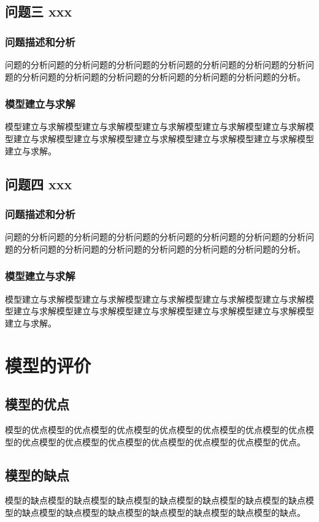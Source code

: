 \documentclass[withoutperface,bwprint]{gmcmthesis}
\numberwithin{figure}{section}
\begin{document}
\subsection{问题三 xxx}
\subsubsection{问题描述和分析}
问题的分析问题的分析问题的分析问题的分析问题的分析问题的分析问题的分析问题的分析问题的分析问题的分析问题的分析问题的分析问题的分析问题的分析。
\subsubsection{模型建立与求解}
模型建立与求解模型建立与求解模型建立与求解模型建立与求解模型建立与求解模型建立与求解模型建立与求解模型建立与求解模型建立与求解模型建立与求解模型建立与求解。

\subsection{问题四 xxx}
\subsubsection{问题描述和分析}
问题的分析问题的分析问题的分析问题的分析问题的分析问题的分析问题的分析问题的分析问题的分析问题的分析问题的分析问题的分析问题的分析问题的分析。
\subsubsection{模型建立与求解}
模型建立与求解模型建立与求解模型建立与求解模型建立与求解模型建立与求解模型建立与求解模型建立与求解模型建立与求解模型建立与求解模型建立与求解模型建立与求解。

\section{模型的评价}
\subsection{模型的优点}
模型的优点模型的优点模型的优点模型的优点模型的优点模型的优点模型的优点模型的优点模型的优点模型的优点模型的优点模型的优点模型的优点模型的优点。
\subsection{模型的缺点}
模型的缺点模型的缺点模型的缺点模型的缺点模型的缺点模型的缺点模型的缺点模型的缺点模型的缺点模型的缺点模型的缺点模型的缺点模型的缺点模型的缺点。
\end{document}
